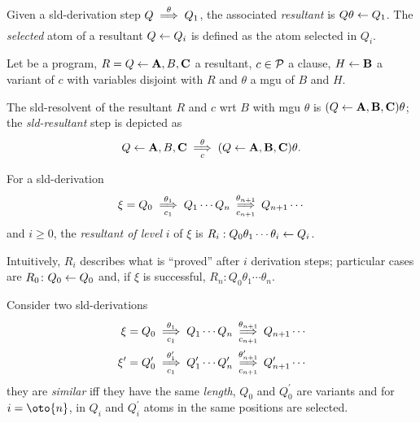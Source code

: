 \begin{dfn}[Resultant]
    Given a \gls{sld}-derivation step \(Q \underset{}{\overset{\theta}{\implies}} Q_1\), the associated \emph{resultant} is \(Q\theta \leftarrow Q_1\).
    The \emph{selected} atom of a resultant \(Q \leftarrow Q_i\) is defined as the atom selected in \(Q_i\).

    Let \prog be a program, \(R = Q \leftarrow \mathbf{A}, B, \mathbf{C}\) a resultant, \(c \in \mathcal{P}\) a clause, \(H \leftarrow \mathbf{B}\) a variant of \(c\) with variables disjoint with \(R\) and \(\theta\) a \gls{mgu} of \(B\) and \(H\).

    The \gls{sld}-resolvent of the resultant \(R\) and \(c\) wrt \(B\) with \gls{mgu} \(\theta\) is \((Q \leftarrow \mathbf{A}, \mathbf{B}, \mathbf{C})\theta\); the \emph{\gls{sld}-resultant} step is depicted as
    \begin{equation*}
        Q \leftarrow \mathbf{A}, B, \mathbf{C} \underset{c}{\overset{\theta}{\implies}} (Q \leftarrow \mathbf{A}, \mathbf{B}, \mathbf{C})\theta.
    \end{equation*}
\end{dfn}

\begin{dfn}
    For a \gls{sld}-derivation
    \begin{equation*}
        \xi = Q_0 \underset{c_1}{\overset{\theta_1}{\implies}} Q_1 \dotsb Q_n
        \underset{c_{n+1}}{\overset{\theta_{n+1}}{\implies}} Q_{n+1} \dotsb
    \end{equation*}
    and \(i \ge 0\), the \emph{resultant of level} \(i\) of \(\xi\) is \(R_i : Q_0\theta_1\dotsb\theta_i \leftarrow Q_i\).

    Intuitively, \(R_i\) describes what is ``proved'' after \(i\) derivation steps; particular cases are \(R_0 \colon Q_0 \leftarrow Q_0\) and, if \(\xi\) is successful, \(R_n \colon Q_0\theta_1\dotsb\theta_n\).
\end{dfn}

\begin{dfn}
    Consider two \gls{sld}-derivations
    \begin{align*}
        \xi &= Q_0 \underset{c_1}{\overset{\theta_1}{\implies}} Q_1 \dotsb Q_n
        \underset{c_{n+1}}{\overset{\theta_{n+1}}{\implies}} Q_{n+1} \dotsb \\
        \xi^\prime &= Q_0^\prime \underset{c_1}{\overset{\theta_1^\prime}{\implies}} Q_1^\prime \dotsb Q_n^\prime
        \underset{c_{n+1}}{\overset{\theta_{n+1}^\prime}{\implies}} Q_{n+1}^\prime \dotsb
    \end{align*}
    they are \emph{similar} iff they have the same \emph{length}, \(Q_0\) and \(Q_0^\prime\) are variants and for \(i = \oto{n}\), in \(Q_i\) and \(Q_i^\prime\) atoms in the same positions are selected.
\end{dfn}

